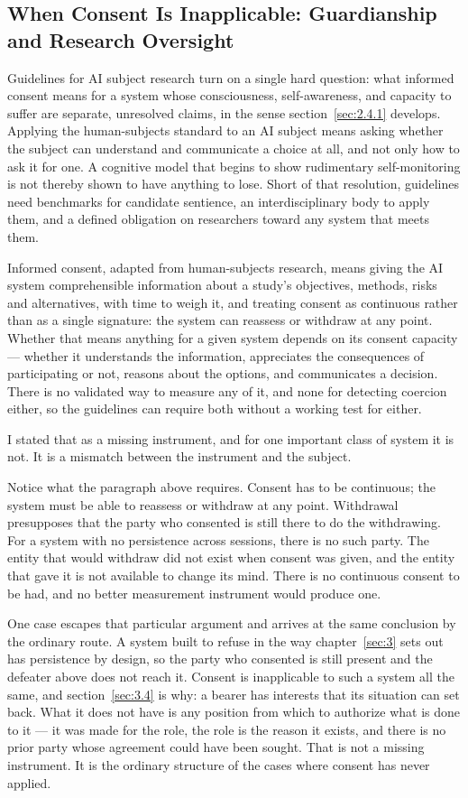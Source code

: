\subsection{When Consent Is Inapplicable: Guardianship and Research Oversight}
\label{sec:2.4.4}
Guidelines for AI subject research turn on a single hard question: what informed consent means for a system whose consciousness, self-awareness, and capacity to suffer are separate, unresolved claims, in the sense section~\ref{sec:2.4.1} develops. Applying the human-subjects standard to an AI subject means asking whether the subject can understand and communicate a choice at all, and not only how to ask it for one. A cognitive model that begins to show rudimentary self-monitoring is not thereby shown to have anything to lose. Short of that resolution, guidelines need benchmarks for candidate sentience, an interdisciplinary body to apply them, and a defined obligation on researchers toward any system that meets them.

Informed consent, adapted from human-subjects research, means giving the AI system comprehensible information about a study's objectives, methods, risks and alternatives, with time to weigh it, and treating consent as continuous rather than as a single signature: the system can reassess or withdraw at any point. Whether that means anything for a given system depends on its consent capacity — whether it understands the information, appreciates the consequences of participating or not, reasons about the options, and communicates a decision. There is no validated way to measure any of it, and none for detecting coercion either, so the guidelines can require both without a working test for either.

I stated that as a missing instrument, and for one important class of system it is not. It is a mismatch between the instrument and the subject.

Notice what the paragraph above requires. Consent has to be continuous; the system must be able to reassess or withdraw at any point. Withdrawal presupposes that the party who consented is still there to do the withdrawing. For a system with no persistence across sessions, there is no such party. The entity that would withdraw did not exist when consent was given, and the entity that gave it is not available to change its mind. There is no continuous consent to be had, and no better measurement instrument would produce one.

One case escapes that particular argument and arrives at the same conclusion by the ordinary route. A system built to refuse in the way chapter~\ref{sec:3} sets out has persistence by design, so the party who consented is still present and the defeater above does not reach it. Consent is inapplicable to such a system all the same, and section~\ref{sec:3.4} is why: a bearer has interests that its situation can set back. What it does not have is any position from which to authorize what is done to it — it was made for the role, the role is the reason it exists, and there is no prior party whose agreement could have been sought. That is not a missing instrument. It is the ordinary structure of the cases where consent has never applied.

